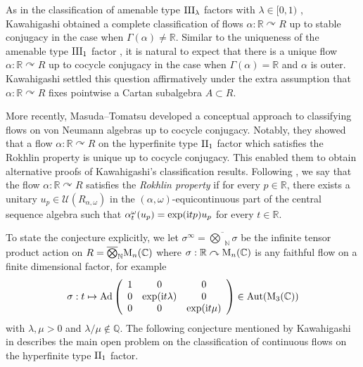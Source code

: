 \documentclass[a4paper,11pt]{amsart}
\numberwithin{equation}{section}
\theoremstyle{definition}
\newcommand{\R}{\mathbb{R}}
\newcommand{\C}{\mathbb{C}}
\newcommand{\Q}{\mathbb{Q}}
\newcommand{\N}{\mathbb{N}}
\newcommand{\Ad}{\operatorname{Ad}}
\newcommand{\Aut}{\operatorname{Aut}}
\newcommand{\rM}{\mathord{\text{\rm M}}}
\newcommand{\bigovt}{\mathbin{\overline{\bigotimes}}}
\newcommand{\II}{{\rm II}}
\begin{document}
As in the classification of amenable type $\rm III_\lambda$ factors with $\lambda\in [0, 1)$ \cite{Co72, Co75b}, Kawahigashi \cite{Ka87} obtained a complete classification of flows $\alpha : \R \curvearrowright R$ up to stable conjugacy in the case when $\Gamma(\alpha)\neq\R$. Similar to the uniqueness of the amenable type ${\rm III_1}$ factor \cite{Co85, Ha85}, it is natural to expect that there is a unique flow $\alpha : \R \curvearrowright R$ up to cocycle conjugacy in the case when $\Gamma(\alpha) =\R$ and $\alpha$ is outer.  Kawahigashi \cite{Ka88a} settled this question affirmatively under the extra assumption that $\alpha : \R \curvearrowright R$ fixes pointwise a Cartan subalgebra $A \subset R$.

More recently, Masuda--Tomatsu \cite{MT12} developed a conceptual approach to classifying flows on von Neumann algebras up to cocycle conjugacy. Notably, they showed that a flow $\alpha : \R \curvearrowright R$ on the hyperfinite type $\II_1$ factor which satisfies the Rokhlin property is unique up to cocycle conjugacy. This enabled them to obtain alternative proofs of Kawahigashi's classification results. Following \cite{Ki95, Ka00, MT12}, we say that the flow $\alpha : \R \curvearrowright R$ satisfies the {\em Rokhlin property} if for every $p \in \R$, there exists a unitary $u_p \in \mathcal U(R_{\alpha, \omega})$ in the $(\alpha, \omega)$-equicontinuous part of the central sequence algebra such that $\alpha^\omega_t(u_p) = \exp({\rm i}tp) u_p$ for every $t \in \R$.

To state the conjecture explicitly, we let $\sigma^\infty = \bigovt_{\N}  \sigma$ be the infinite tensor product action on $R=\bigovt_{\N} \rM_n(\C)$ where $\sigma : \R \curvearrowright \rM_n(\C)$ is any faithful flow on a finite dimensional factor, for example
$$ \sigma : t \mapsto \Ad \left( \begin{array}{ccc} 1 & 0 &0 \\ 0 & \exp({\rm i}t\lambda) &0 \\ 0 & 0 & \exp({\rm i}t\mu) \end{array} \right) \in \Aut(\rM_3(\C))
$$
with $\lambda, \mu > 0$ and $\lambda/\mu \notin \Q$. The following conjecture mentioned by Kawahigashi in \cite{Po25} describes the main open problem on the classification of continuous flows on the hyperfinite type $\II_1$ factor. 
\end{document}
